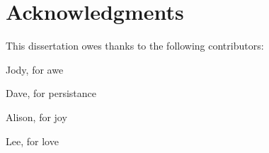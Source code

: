 
\chapter{Acknowledgments}

{\LARGE This dissertation owes thanks to the following contributors:
\vspace{0.5in}

\noindent\hspace{1in} Jody, for awe

\noindent\hspace{1in} Dave, for persistance

\noindent\hspace{1in} Alison, for joy

\noindent\hspace{1in} Lee, for love

}

